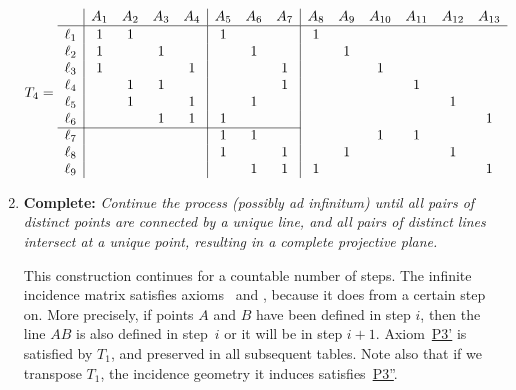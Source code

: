 \begin{xmpl}
\begin{enumerate}[1.]
        \vspace{-2\parskip}
        \small
        \setlength{\arraycolsep}{3pt}
        \begin{align}\label{eq:T4}
            T_4=\begin{array}{l|cccc|ccc|cccccc}
                &A_1 &A_2 &A_3 &A_4 &A_5 &A_6 &A_7
                &A_8 &A_9 &A_{10} &A_{11} &A_{12} &A_{13}\\
                \hline\rule{0pt}{9pt}
                \ell_1 &1&1&&&1&&&1&&&&&\\
                \ell_2 &1 &&1 &&&1&&&1&&&&\\
                \ell_3 &1 &&&1 &&&1&&&1&&&\\
                \ell_4 &&1 &1 &&&&1&&&&1&&\\
                \ell_5 &&1 &&1 &&1&&&&&&1&\\
                \ell_6 &&&1 &1 &1&&&&&&&&1\\
                \cline{1-8}
                \ell_7 &&&&&1 &1&&&&1&1&&\\
                \ell_8 &&&&&1&&1&&1&&&1&\\
                \ell_9 &&&&&&1&1&1&&&&&1
            \end{array}
        \end{align}
        
        \normalsize

        \item \textbf{Complete:} \textit{Continue the process (possibly \textsl{ad infinitum}) until all pairs of distinct points are connected by a unique line, and all pairs of distinct lines intersect at a unique point, resulting in a complete projective plane.}

        This construction continues for a countable number of steps. The infinite incidence matrix satisfies axioms~ and , because it does from a certain step on. More precisely, if points $A$ and $B$ have been defined in step $i$, then the line $AB$ is also defined in step~$i$ or it will be in step $i+1$. Axiom~\hyperref[lem:alternative-projective-axiom]{P3'} is satisfied by \hyperref[eq:T1]{$T_1$}, and preserved in all subsequent tables. Note also that if we transpose \hyperref[eq:T1]{$T_1$}, the incidence geometry it induces satisfies~\hyperref[lem:alternative-projective-axiom]{P3''}.
    \end{enumerate}
\end{xmpl}


